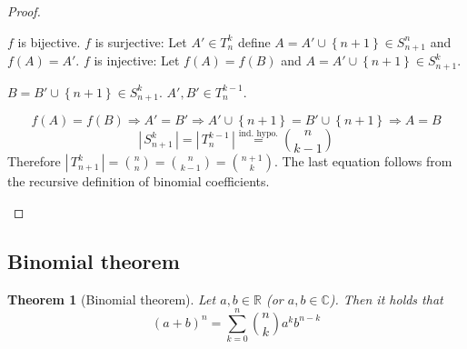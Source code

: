 \documentclass[a4paper,landscape,twocolumn]{article}
\newtheorem{theorem}{Theorem}
\newcommand\set[1]{\left\{#1\right\}}
\newcommand\card[1]{\left|\,#1\,\right|}
\begin{document}
\begin{proof}
\begin{description}
      $f$ is bijective.
      $f$ is surjective: Let $A' \in T_n^k$ define $A = A' \cup \set{n+1} \in S_{n+1}^n$ and $f(A) = A'$.
      $f$ is injective: Let $f(A) = f(B)$ and $A = A' \cup \set{n+1} \in S_{n+1}^k$.

      $B = B' \cup \set{n+1} \in S_{n+1}^k$. $A', B' \in T_n^{k-1}$.

      \[ f(A) = f(B) \Rightarrow A' = B' \Rightarrow A' \cup \set{n+1} = B' \cup \set{n+1} \Rightarrow A = B \]
      \[ \card{S_{n+1}^k} = \card{T_n^{k-1}} \stackrel{\text{ind. hypo.}}{=} \binom{n}{k-1} \]
      Therefore $\card{T_{n+1}^k} = \binom nn = \binom n{k-1} = \binom{n+1}{k}$.
      The last equation follows from the recursive definition of binomial coefficients.
  \end{description}
\end{proof}

\subsection{Binomial theorem}
\begin{theorem}[Binomial theorem]
  Let $a, b \in \mathbb{R}$ (or $a, b \in \mathbb{C}$). Then it holds that
  \[ (a + b)^n = \sum_{k=0}^n \binom{n}{k} a^k b^{n-k} \]
\end{theorem}
\end{document}
